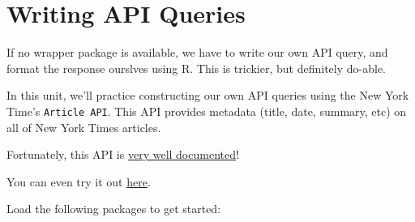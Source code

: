 \documentclass[]{book}
\newenvironment{Shaded}{\begin{snugshade}}{\end{snugshade}}
\newcommand{\KeywordTok}[1]{\textcolor[rgb]{0.13,0.29,0.53}{\textbf{#1}}}
\newcommand{\DataTypeTok}[1]{\textcolor[rgb]{0.13,0.29,0.53}{#1}}
\newcommand{\DecValTok}[1]{\textcolor[rgb]{0.00,0.00,0.81}{#1}}
\newcommand{\StringTok}[1]{\textcolor[rgb]{0.31,0.60,0.02}{#1}}
\newcommand{\CommentTok}[1]{\textcolor[rgb]{0.56,0.35,0.01}{\textit{#1}}}
\newcommand{\OtherTok}[1]{\textcolor[rgb]{0.56,0.35,0.01}{#1}}
\newcommand{\OperatorTok}[1]{\textcolor[rgb]{0.81,0.36,0.00}{\textbf{#1}}}
\newcommand{\NormalTok}[1]{#1}
\begin{document}
\begin{Shaded}
\end{Shaded}

\hypertarget{writing-api-queries}{\section{Writing API
Queries}\label{writing-api-queries}}

If no wrapper package is available, we have to write our own API query,
and format the response ourslves using R. This is trickier, but
definitely do-able.

In this unit, we'll practice constructing our own API queries using the
New York Time's \texttt{Article\ API}. This API provides metadata
(title, date, summary, etc) on all of New York Times articles.

Fortunately, this API is
\href{https://developer.nytimes.com/docs/articlesearch-product/1/overview}{very
well documented}!

You can even try it out
\href{http://developer.nytimes.com/io-docs}{here}.

Load the following packages to get started:
\end{document}
